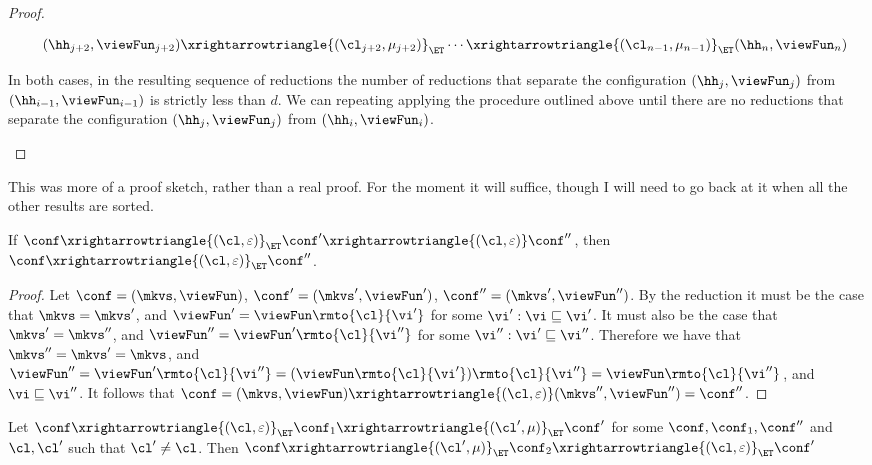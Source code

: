 \begin{proof}
\begin{enumerate}
\begin{itemize}
\[\begin{array}{@{}l@{}}
\quad (\hh_{j+2}, \viewFun_{j+2}) \xrightarrowtriangle{(\cl_{j+2}, \mu_{j+2})}_{\ET} \cdots 
\xrightarrowtriangle{(\cl_{n-1}, \mu_{n-1})}_{\ET} (\hh_{n}, \viewFun_{n})
\end{array}
\]
\end{itemize}
In both cases, in the resulting sequence of reductions the number of reductions that separate 
the configuration $(\hh_{j}, \viewFun_{j})$ from $(\hh_{i-1}, \viewFun_{i-1})$ is strictly 
less than $d$. We can repeating applying the procedure outlined above until there are 
no reductions that separate the configuration $(\hh_{j}, \viewFun_{j})$ from 
$(\hh_{i}, \viewFun_{i})$.
\end{enumerate}
\end{proof}
\ac{This was more of a proof sketch, rather than a real proof. For the moment it will suffice, though 
I will need to go back at it when all the other results are sorted.}


\begin{lemma}[Absorption]
\label{lem:et.absorb}
If $\conf \xrightarrowtriangle{(\cl, \varepsilon)}_{\ET} \conf' \xrightarrowtriangle{(\cl, \varepsilon)} \conf''$, then 
$\conf \xrightarrowtriangle{(\cl, \varepsilon)}_{\ET} \conf''$.
\end{lemma}

\begin{proof}
Let $\conf = (\mkvs, \viewFun)$, $\conf' = (\mkvs', \viewFun')$, $\conf'' = (\mkvs', \viewFun'')$. 
By the reduction it must be the case that $\mkvs = \mkvs'$, and $\viewFun' = \viewFun\rmto{\cl}{\vi'}$ 
for some $\vi' : \vi \sqsubseteq \vi'$. It must also be the case that $\mkvs' = \mkvs''$, and $\viewFun'' = \viewFun'\rmto{\cl}{\vi''}$ 
for some $\vi'': \vi' \sqsubseteq \vi''$. Therefore we have that $\mkvs'' = \mkvs' = \mkvs$, and 
$\viewFun'' = \viewFun'\rmto{\cl}{\vi''} = (\viewFun\rmto{\cl}{\vi'})\rmto{\cl}{\vi''} = \viewFun\rmto{\cl}{\vi''}$, 
and $\vi \sqsubseteq \vi''$. 
It follows that $\conf = (\mkvs, \viewFun) \xrightarrowtriangle{(\cl, \varepsilon)} (\mkvs'', \viewFun'') = \conf''$.
\end{proof}

\begin{lemma}
\label{lem:viewshift.rightmover}
Let $\conf \xrightarrowtriangle{(\cl, \varepsilon)}_{\ET} \conf_1 \xrightarrowtriangle{(\cl', \mu)}_{\ET} \conf'$ 
for some $\conf, \conf_1, \conf''$ and $\cl, \cl'$ such that $\cl' \neq \cl$. 
Then $\conf \xrightarrowtriangle{(\cl', \mu)}_{\ET} \conf_2 \xrightarrowtriangle{(\cl, \varepsilon)}_{\ET} \conf'$ 
\end{lemma}

